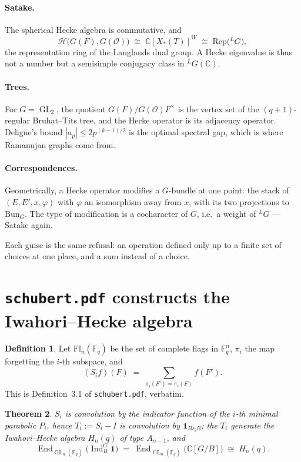 \documentclass[11pt,a4paper]{article}
\newtheorem{theorem}{Theorem}[section]
\theoremstyle{definition}
\newtheorem{definition}[theorem]{Definition}
\theoremstyle{remark}
\newcommand{\FF}{\mathbb{F}}
\newcommand{\CC}{\mathbb{C}}
\newcommand{\OO}{\mathcal{O}}
\newcommand{\Bun}{\mathrm{Bun}}
\newcommand{\Rep}{\mathrm{Rep}}
\newcommand{\dual}[1]{{}^{L}\!#1}
\DeclareMathOperator{\End}{End}
\DeclareMathOperator{\GL}{GL}
\DeclareMathOperator{\Ind}{Ind}
\newcommand{\Fl}{\mathrm{Fl}}
\begin{document}
\paragraph{Satake.} The spherical Hecke algebra is commutative, and
\[
  \mathcal{H}\bigl(G(F), G(\OO)\bigr) \;\cong\; \CC[X_*(T)]^{W}
  \;\cong\; \Rep\bigl(\dual{G}\bigr) ,
\]
the representation ring of the Langlands dual group. A Hecke eigenvalue is thus
not a number but a semisimple conjugacy class in $\dual{G}(\CC)$.

\paragraph{Trees.} For $G = \GL_2$, the quotient $G(F)/G(\OO)F^\times$ is the
vertex set of the $(q+1)$-regular Bruhat--Tits tree, and the Hecke operator is
its adjacency operator. Deligne's bound $|a_p| \le 2p^{(k-1)/2}$ is the optimal
spectral gap, which is where Ramanujan graphs come from.

\paragraph{Correspondences.} Geometrically, a Hecke operator modifies a
$G$-bundle at one point: the stack of $(E, E', x, \varphi)$ with $\varphi$ an
isomorphism away from $x$, with its two projections to $\Bun_G$. The type of
modification is a cocharacter of $G$, i.e.\ a weight of $\dual{G}$ --- Satake
again.

\medskip
\noindent
Each guise is the same refusal: an operation defined only up to a finite set of
choices at one place, and a sum instead of a choice.

\section{\texttt{schubert.pdf} constructs the Iwahori--Hecke
algebra}\label{sec:iwahori}

\begin{definition}\label{def:flag}
Let $\Fl_n(\FF_q)$ be the set of complete flags in $\FF_q^n$, $\pi_i$ the map
forgetting the $i$-th subspace, and
\[
  (S_i f)(F) \;=\; \sum_{\pi_i(F') = \pi_i(F)} f(F') .
\]
This is Definition~3.1 of \texttt{schubert.pdf}, verbatim.
\end{definition}

\begin{theorem}\label{thm:iwahori}
$S_i$ is convolution by the indicator function of the $i$-th minimal parabolic
$P_i$, hence $T_i := S_i - I$ is convolution by $\mathbf{1}_{Bs_iB}$; the $T_i$
generate the Iwahori--Hecke algebra $H_n(q)$ of type $A_{n-1}$, and
\[
  \End_{\GL_n(\FF_q)}\bigl(\Ind_B^G \mathbf{1}\bigr)
  \;=\; \End_{\GL_n(\FF_q)}\bigl(\CC[G/B]\bigr)
  \;\cong\; H_n(q) .
\]
\end{theorem}
\end{document}
